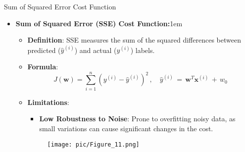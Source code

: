 \documentclass[serif, aspectratio=169]{beamer}
\begin{document}
\begin{frame}{Sum of Squared Error Cost Function}
    \begin{itemize}
        \item \textbf{Sum of Squared Error (SSE) Cost Function:}\itemsep1em
        \medskip
        \begin{itemize}\itemsep0.8em
            \item \textbf{Definition}:
            SSE measures the sum of the squared differences between predicted (\(\hat{y}^{(i)}\)) and actual (\(y^{(i)}\)) labels.
            \item \textbf{Formula}:
                \[
                J(\mathbf{w}) = \sum_{i=1}^{n} (y^{(i)} - \hat{y}^{(i)})^2 \, , \quad \hat{y}^{(i)} \, = \, \mathbf{w}^T\mathbf{x}^{(i)} \, + \, w_0
                \]
            \item \textbf{Limitations}: \\
            \medskip
        \begin{itemize}
            \item \justifying \textbf{Low Robustness to Noise}:
            Prone to overfitting noisy data, as small variations can cause significant changes in the cost.
        \end{itemize}
        \endminipage
        \hspace{1cm}
            \begin{figure}[bh]
                \texttt{[image: pic/Figure\_11.png]}
            \end{figure}
        \endminipage
        \end{itemize}
    \end{itemize}
\end{frame}
\end{document}
